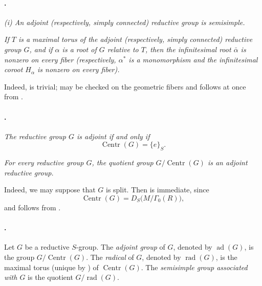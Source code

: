 \paragraph{.}
\textit{\textup{(i)} An adjoint \textup{(respectively, simply
connected)} reductive group is semisimple.}

\textit{\textup{} If \(T\) is a maximal torus of the adjoint
\textup{(respectively, simply connected)} reductive group \(G\),
and if \(\alpha\) is a root of \(G\) relative to \(T\), then the
infinitesimal root \(\bar\alpha\) is nonzero on every fiber
\textup{(respectively, \(\alpha^*\) is a monomorphism and the
infinitesimal coroot \(H_\alpha\) is nonzero on every fiber)}.}

Indeed, \textup{} is trivial; \textup{} may be checked on
the geometric fibers and follows at once from .

\paragraph{.}
\textit{\textup{} The reductive group \(G\) is adjoint if and
only if}
\[
  \operatorname{Centr}(G)=\{e\}_S.
\]

\textit{\textup{} For every reductive group \(G\), the quotient
group \(G/\operatorname{Centr}(G)\) is an adjoint reductive group.}

Indeed, we may suppose that \(G\) is split. Then \textup{} is
immediate, since
\[
  \operatorname{Centr}(G)=D_S\bigl(M/\Gamma_0(R)\bigr),
\]
and \textup{} follows from .

\paragraph{.}
Let \(G\) be a reductive \(S\)-group. The \emph{adjoint group} of
\(G\), denoted by \(\operatorname{ad}(G)\), is the group
\(G/\operatorname{Centr}(G)\). The \emph{radical} of \(G\), denoted
by \(\operatorname{rad}(G)\), is the maximal torus
\textup{(unique by )} of
\(\operatorname{Centr}(G)\). The \emph{semisimple group associated
with \(G\)} is the quotient \(G/\operatorname{rad}(G)\).

